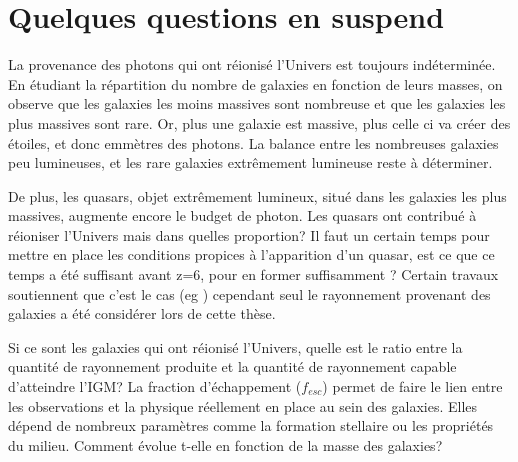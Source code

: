 \section{Quelques questions en suspend}



La provenance des photons qui ont réionisé l'Univers est toujours indéterminée.
En étudiant la répartition du nombre de galaxies en fonction de leurs masses, on observe que les galaxies les moins massives sont nombreuse et que les galaxies les plus massives sont rare.
Or, plus une galaxie est massive, plus celle ci va créer des étoiles, et donc emmètres des photons.
La balance entre les nombreuses galaxies peu lumineuses, et les rare galaxies extrêmement lumineuse reste à déterminer.

De plus, les quasars, objet extrêmement lumineux, situé dans les galaxies les plus massives, augmente encore le budget de photon.
Les quasars ont contribué à réioniser l'Univers mais dans quelles proportion?
Il faut un certain temps pour mettre en place les conditions propices à l'apparition d'un quasar, est ce que ce temps a été suffisant avant z=6, pour en former suffisamment ?
Certain travaux soutiennent que c'est le cas (eg \cite{chardin_large-scale_2017}) cependant seul le rayonnement provenant des galaxies a été considérer lors de cette thèse.

Si ce sont les galaxies qui ont réionisé l'Univers, quelle est le ratio entre la quantité de rayonnement produite et la quantité de rayonnement capable d'atteindre l'\ac{IGM}?
La fraction d'échappement ($f_{esc}$) permet de faire le lien entre les observations et la physique réellement en place au sein des galaxies.
Elles dépend de nombreux paramètres comme la formation stellaire ou les propriétés du milieu.
Comment évolue t-elle en fonction de la masse des galaxies? 


